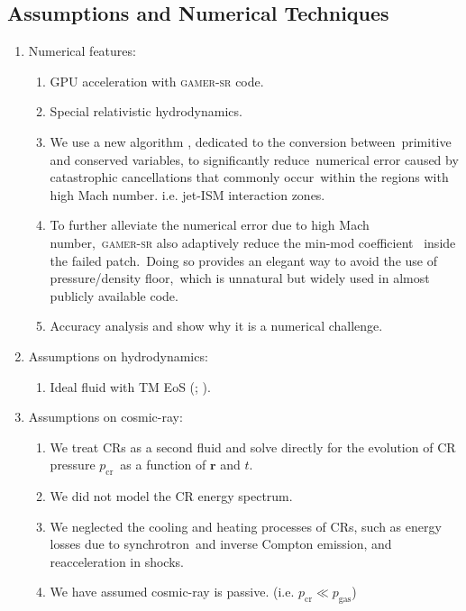 \documentclass[twocolumn]{aastex631}
\begin{document}
\subsection{Assumptions and Numerical Techniques}
\begin{enumerate}
  \item Numerical features:
    \begin{enumerate}
      \item GPU acceleration with \textsc{gamer-sr} code.
      \item Special relativistic hydrodynamics.
      \item We use a new algorithm \citep{tseng2021}, dedicated to the conversion between\
            primitive and conserved variables, to significantly reduce\
            numerical error caused by catastrophic cancellations that commonly occur\
            within the regions with high Mach number. i.e. jet-ISM interaction zones.
      \item To further alleviate the numerical error due to high Mach number,\
            \textsc{gamer-sr} also adaptively reduce the min-mod coefficient \citep{tseng2021}\
            inside the failed patch.\
            Doing so provides an elegant way to avoid the use of pressure/density floor,\
            which is unnatural but widely used in almost publicly available code.
      \item Accuracy analysis and show why it is a numerical challenge.
    \end{enumerate}
  \item Assumptions on hydrodynamics:
    \begin{enumerate}
      \item Ideal fluid with TM EoS (\citealt{Taub}; \citealt{TM_EOS}).
    \end{enumerate}
  \item Assumptions on cosmic-ray:
    \begin{enumerate}
      \item We treat CRs as a second fluid and solve directly for the evolution of CR pressure $p_{\text{cr}}$\
            as a function of $\mathbf{r}$ and $t$.
      \item We did not model the CR energy spectrum.
      \item We neglected the cooling and heating processes of CRs, such as energy losses due to synchrotron\
            and inverse Compton emission, and reacceleration in shocks.
      \item We have assumed cosmic-ray is passive. (i.e. $p_{\text{cr}}\ll p_{\text{gas}}$)

\end{enumerate}
\end{enumerate}
\end{document}
